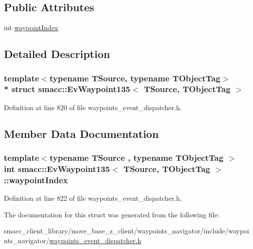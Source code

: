 \subsection*{Public Attributes}
\begin{DoxyCompactItemize}
\item 
int \hyperlink{structsmacc_1_1EvWaypoint135_aeb4140a0a67fefc74d7fbb1b2529e119}{waypoint\+Index}
\end{DoxyCompactItemize}


\subsection{Detailed Description}
\subsubsection*{template$<$typename T\+Source, typename T\+Object\+Tag$>$\\*
struct smacc\+::\+Ev\+Waypoint135$<$ T\+Source, T\+Object\+Tag $>$}



Definition at line 820 of file waypoints\+\_\+event\+\_\+dispatcher.\+h.



\subsection{Member Data Documentation}
\subsubsection[{\texorpdfstring{waypoint\+Index}{waypointIndex}}]{\setlength{\rightskip}{0pt plus 5cm}template$<$typename T\+Source , typename T\+Object\+Tag $>$ int {\bf smacc\+::\+Ev\+Waypoint135}$<$ T\+Source, T\+Object\+Tag $>$\+::waypoint\+Index}\hypertarget{structsmacc_1_1EvWaypoint135_aeb4140a0a67fefc74d7fbb1b2529e119}{}\label{structsmacc_1_1EvWaypoint135_aeb4140a0a67fefc74d7fbb1b2529e119}


Definition at line 822 of file waypoints\+\_\+event\+\_\+dispatcher.\+h.



The documentation for this struct was generated from the following file\+:\begin{DoxyCompactItemize}
\item 
smacc\+\_\+client\+\_\+library/move\+\_\+base\+\_\+z\+\_\+client/waypoints\+\_\+navigator/include/waypoints\+\_\+navigator/\hyperlink{waypoints__event__dispatcher_8h}{waypoints\+\_\+event\+\_\+dispatcher.\+h}\end{DoxyCompactItemize}
